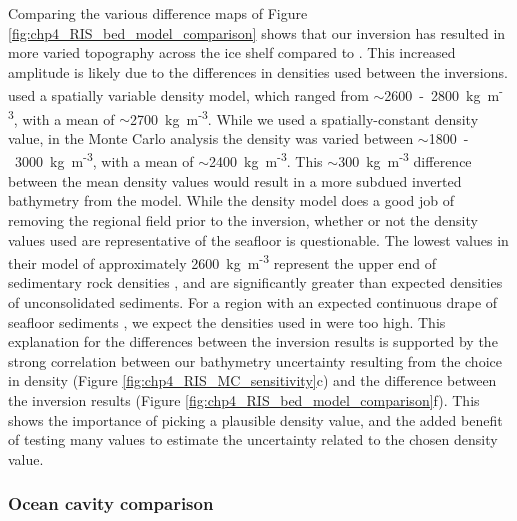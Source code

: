 Comparing the various difference maps of Figure \ref{fig:chp4_RIS_bed_model_comparison} shows that our inversion has resulted in more varied topography across the ice shelf compared to \citet{tintoross2019}. This increased amplitude is likely due to the differences in densities used between the inversions. \citet{tintoross2019} used a spatially variable density model, which ranged from $\sim$2600~-~2800~kg~m\textsuperscript{-3}, with a mean of $\sim$2700~kg~m\textsuperscript{-3}. While we used a spatially-constant density value, in the Monte Carlo analysis the density was varied between $\sim$1800~-~3000~kg~m\textsuperscript{-3}, with a mean of $\sim$2400~kg~m\textsuperscript{-3}. This $\sim$300~kg~m\textsuperscript{-3} difference between the mean density values would result in a more subdued inverted bathymetry from the \citep{tintoross2019} model. While the \citet{tintoross2019} density model does a good job of removing the regional field prior to the inversion, whether or not the density values used are representative of the seafloor is questionable. The lowest values in their model of approximately 2600~kg~m\textsuperscript{-3} represent the upper end of sedimentary rock densities \citep{schöndensity2015}, and are significantly greater than expected densities of unconsolidated sediments. For a region with an expected continuous drape of seafloor sediments \citep[Chapter \ref{ch:2},][]{tankersleybasement2022}, we expect the densities used in \citep{tintoross2019} were too high. This explanation for the differences between the inversion results is supported by the strong correlation between our bathymetry uncertainty resulting from the choice in density (Figure \ref{fig:chp4_RIS_MC_sensitivity}c) and the difference between the inversion results (Figure \ref{fig:chp4_RIS_bed_model_comparison}f). This shows the importance of picking a plausible density value, and the added benefit of testing many values to estimate the uncertainty related to the chosen density value. \\


\subsubsection{Ocean cavity comparison}


